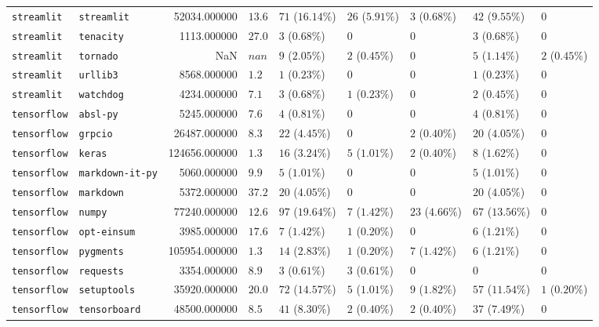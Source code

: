 \begin{table}
\begin{tabular}{llrllllll}
\texttt{streamlit} & \texttt{streamlit} & 52034.000000 & $13.6$ & $71$ ($16.14\%$) & $26$ ($5.91\%$) & $3$ ($0.68\%$) & $42$ ($9.55\%$) & $0$ \\
\texttt{streamlit} & \texttt{tenacity} & 1113.000000 & $27.0$ & $3$ ($0.68\%$) & $0$ & $0$ & $3$ ($0.68\%$) & $0$ \\
\texttt{streamlit} & \texttt{tornado} & NaN & $nan$ & $9$ ($2.05\%$) & $2$ ($0.45\%$) & $0$ & $5$ ($1.14\%$) & $2$ ($0.45\%$) \\
\texttt{streamlit} & \texttt{urllib3} & 8568.000000 & $1.2$ & $1$ ($0.23\%$) & $0$ & $0$ & $1$ ($0.23\%$) & $0$ \\
\texttt{streamlit} & \texttt{watchdog} & 4234.000000 & $7.1$ & $3$ ($0.68\%$) & $1$ ($0.23\%$) & $0$ & $2$ ($0.45\%$) & $0$ \\
\texttt{tensorflow} & \texttt{absl-py} & 5245.000000 & $7.6$ & $4$ ($0.81\%$) & $0$ & $0$ & $4$ ($0.81\%$) & $0$ \\
\texttt{tensorflow} & \texttt{grpcio} & 26487.000000 & $8.3$ & $22$ ($4.45\%$) & $0$ & $2$ ($0.40\%$) & $20$ ($4.05\%$) & $0$ \\
\texttt{tensorflow} & \texttt{keras} & 124656.000000 & $1.3$ & $16$ ($3.24\%$) & $5$ ($1.01\%$) & $2$ ($0.40\%$) & $8$ ($1.62\%$) & $0$ \\
\texttt{tensorflow} & \texttt{markdown-it-py} & 5060.000000 & $9.9$ & $5$ ($1.01\%$) & $0$ & $0$ & $5$ ($1.01\%$) & $0$ \\
\texttt{tensorflow} & \texttt{markdown} & 5372.000000 & $37.2$ & $20$ ($4.05\%$) & $0$ & $0$ & $20$ ($4.05\%$) & $0$ \\
\texttt{tensorflow} & \texttt{numpy} & 77240.000000 & $12.6$ & $97$ ($19.64\%$) & $7$ ($1.42\%$) & $23$ ($4.66\%$) & $67$ ($13.56\%$) & $0$ \\
\texttt{tensorflow} & \texttt{opt-einsum} & 3985.000000 & $17.6$ & $7$ ($1.42\%$) & $1$ ($0.20\%$) & $0$ & $6$ ($1.21\%$) & $0$ \\
\texttt{tensorflow} & \texttt{pygments} & 105954.000000 & $1.3$ & $14$ ($2.83\%$) & $1$ ($0.20\%$) & $7$ ($1.42\%$) & $6$ ($1.21\%$) & $0$ \\
\texttt{tensorflow} & \texttt{requests} & 3354.000000 & $8.9$ & $3$ ($0.61\%$) & $3$ ($0.61\%$) & $0$ & $0$ & $0$ \\
\texttt{tensorflow} & \texttt{setuptools} & 35920.000000 & $20.0$ & $72$ ($14.57\%$) & $5$ ($1.01\%$) & $9$ ($1.82\%$) & $57$ ($11.54\%$) & $1$ ($0.20\%$) \\
\texttt{tensorflow} & \texttt{tensorboard} & 48500.000000 & $8.5$ & $41$ ($8.30\%$) & $2$ ($0.40\%$) & $2$ ($0.40\%$) & $37$ ($7.49\%$) & $0$ \\

\end{tabular}
\end{table}

